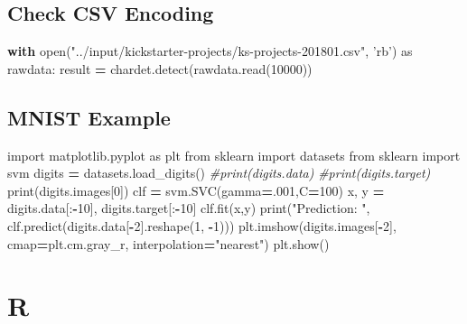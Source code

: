 \documentclass[]{book}
\newenvironment{Shaded}{\begin{snugshade}}{\end{snugshade}}
\newcommand{\DecValTok}[1]{\textcolor[rgb]{0.00,0.00,0.81}{#1}}
\newcommand{\StringTok}[1]{\textcolor[rgb]{0.31,0.60,0.02}{#1}}
\newcommand{\ImportTok}[1]{#1}
\newcommand{\CommentTok}[1]{\textcolor[rgb]{0.56,0.35,0.01}{\textit{#1}}}
\newcommand{\ControlFlowTok}[1]{\textcolor[rgb]{0.13,0.29,0.53}{\textbf{#1}}}
\newcommand{\OperatorTok}[1]{\textcolor[rgb]{0.81,0.36,0.00}{\textbf{#1}}}
\newcommand{\BuiltInTok}[1]{#1}
\newcommand{\NormalTok}[1]{#1}
\theoremstyle{definition}
\theoremstyle{definition}
\theoremstyle{definition}
\theoremstyle{remark}
\begin{document}
\subsection{Check CSV Encoding}\label{check-csv-encoding}

\begin{Shaded}
\begin{Highlighting}[]
\ControlFlowTok{with} \BuiltInTok{open}\NormalTok{(}\StringTok{"../input/kickstarter-projects/ks-projects-201801.csv"}\NormalTok{, }\StringTok{'rb'}\NormalTok{) }\ImportTok{as}\NormalTok{ rawdata:}
\NormalTok{    result }\OperatorTok{=}\NormalTok{ chardet.detect(rawdata.read(}\DecValTok{10000}\NormalTok{))}
\end{Highlighting}
\end{Shaded}

\subsection{MNIST Example}\label{mnist-example}

\begin{Shaded}
\begin{Highlighting}[]
\ImportTok{import}\NormalTok{ matplotlib.pyplot }\ImportTok{as}\NormalTok{ plt}
\ImportTok{from}\NormalTok{ sklearn }\ImportTok{import}\NormalTok{ datasets}
\ImportTok{from}\NormalTok{ sklearn }\ImportTok{import}\NormalTok{ svm}
\NormalTok{digits }\OperatorTok{=}\NormalTok{ datasets.load_digits()}
\CommentTok{#print(digits.data)}
\CommentTok{#print(digits.target)}
\BuiltInTok{print}\NormalTok{(digits.images[}\DecValTok{0}\NormalTok{])}
\NormalTok{clf }\OperatorTok{=}\NormalTok{ svm.SVC(gamma}\OperatorTok{=}\NormalTok{.}\DecValTok{001}\NormalTok{,C}\OperatorTok{=}\DecValTok{100}\NormalTok{)}
\NormalTok{x, y }\OperatorTok{=}\NormalTok{ digits.data[:}\OperatorTok{-}\DecValTok{10}\NormalTok{], digits.target[:}\OperatorTok{-}\DecValTok{10}\NormalTok{]}
\NormalTok{clf.fit(x,y)}
\BuiltInTok{print}\NormalTok{(}\StringTok{"Prediction: "}\NormalTok{, clf.predict(digits.data[}\OperatorTok{-}\DecValTok{2}\NormalTok{].reshape(}\DecValTok{1}\NormalTok{, }\OperatorTok{-}\DecValTok{1}\NormalTok{)))}
\NormalTok{plt.imshow(digits.images[}\OperatorTok{-}\DecValTok{2}\NormalTok{], cmap}\OperatorTok{=}\NormalTok{plt.cm.gray_r, interpolation}\OperatorTok{=}\StringTok{"nearest"}\NormalTok{)}
\NormalTok{plt.show()}
\end{Highlighting}
\end{Shaded}

\section{R}\label{r}
\end{document}
